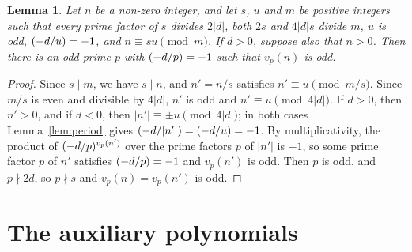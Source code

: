 \documentclass[11pt]{article}
\newtheorem{lemma}[theorem]{Lemma}
\newcommand{\leg}[2]{\mathchoice{\biggl(\dfrac{#1}{#2}\biggr)}{(#1/#2)}{(#1/#2)}{(#1/#2)}}
\begin{document}
\begin{lemma}\label{lem:odd}
Let $n$ be a non-zero integer, and let $s$, $u$ and $m$ be positive integers such that every prime factor of $s$ divides $2|d|$, both $2s$ and $4|d|s$ divide $m$, $u$ is odd, $\leg{-d}{u}=-1$, and $n\equiv su\pmod m$. If $d>0$, suppose also that $n>0$. Then there is an odd prime $p$ with $\leg{-d}{p}=-1$ such that $v_p(n)$ is odd.
\end{lemma}

\begin{proof}
Since $s\mid m$, we have $s\mid n$, and $n'=n/s$ satisfies $n'\equiv u\pmod{m/s}$. Since $m/s$ is even and divisible by $4|d|$, $n'$ is odd and $n'\equiv u\pmod{4|d|}$. If $d>0$, then $n'>0$, and if $d<0$, then $|n'|\equiv\pm u\pmod{4|d|}$; in both cases Lemma~\ref{lem:period} gives $\leg{-d}{|n'|}=\leg{-d}{u}=-1$. By multiplicativity, the product of $\leg{-d}{p}^{v_p(n')}$ over the prime factors $p$ of $|n'|$ is $-1$, so some prime factor $p$ of $n'$ satisfies $\leg{-d}{p}=-1$ and $v_p(n')$ is odd. Then $p$ is odd, and $p\nmid2d$, so $p\nmid s$ and $v_p(n)=v_p(n')$ is odd.
\end{proof}

\section{The auxiliary polynomials}
\end{document}
